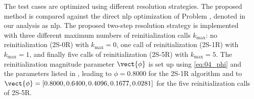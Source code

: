 The test cases are optimized using different resolution strategies. The proposed method is compared against the direct \gls{nlp} optimization of Problem , denoted in our analysis as \gls{nlp}. The proposed two-step resolution strategy is implemented with three different maximum numbers of reinitialization calls $k_{\text{max}}$: no reinitialization (2S-0R) with $k_{\text{max}}=0$, one call of reinitialization (2S-1R) with $k_{\text{max}}=1$, and finally five calls of reinitialization (2S-5R) with $k_{\text{max}}=5$. The reinitialization magnitude parameter $\vect{\phi}$ is set up using \eqref{eq:04_phi} and the parameters listed in , leading to $\phi = 0.8000$ for the 2S-1R algorithm and to $\vect{\phi} = \left[ 0.8000, 0.6400, 0.4096, 0.1677, 0.0281 \right]$ for the five reinitialization calls of 2S-5R.

